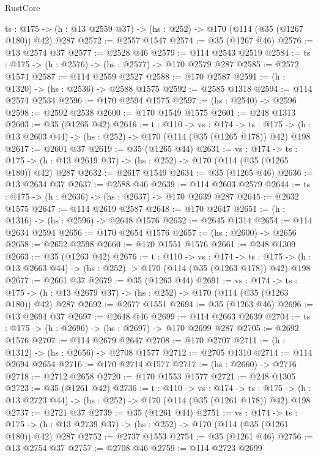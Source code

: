 \begin{lexlean}{RustCore}
\begin{coremodule}
  {ts : @175} -> (h : @13 @2559 @37) -> (hs : @252) -> @170 (@114 (@35 (@1267 @180)) @42) @287
@2572 := @2557 @1547
@2574 := @35 (@1267 @46)
@2576 := @13 @2574 @37
@2577 := @2528 @46
@2579 := @114 @2543 @2519
@2584 := {ts : @175} -> (h : @2576) -> (hs : @2577) -> @170 @2579 @287
@2585 := @2572 @1574
@2587 := @114 @2559 @2527
@2588 := @170 @2587
@2591 := (h : @1320) -> (hs : @2536) -> @2588 @1575
@2592 := @2585 @1318
@2594 := @114 @2574 @2534
@2596 := @170 @2594 @1575
@2597 := (hs : @2540) -> @2596
@2598 := @2592 @2538
@2600 := @170 @1549 @1575
@2601 := @248 @1313
@2603 := @35 (@1265 @42)
@2616 := {t : @110} ->
  {vs : @174} ->
  {ts : @175} -> (h : @13 @2603 @44) -> (hs : @252) -> @170 (@114 (@35 (@1265 @178)) @42) @198
@2617 := @2601 @37
@2619 := @35 (@1265 @44)
@2631 := {vs : @174} ->
  {ts : @175} -> (h : @13 @2619 @37) -> (hs : @252) -> @170 (@114 (@35 (@1265 @180)) @42) @287
@2632 := @2617 @1549
@2634 := @35 (@1265 @46)
@2636 := @13 @2634 @37
@2637 := @2588 @46
@2639 := @114 @2603 @2579
@2644 := {ts : @175} -> (h : @2636) -> (hs : @2637) -> @170 @2639 @287
@2645 := @2632 @1575
@2647 := @114 @2619 @2587
@2648 := @170 @2647
@2651 := (h : @1316) -> (hs : @2596) -> @2648 @1576
@2652 := @2645 @1314
@2654 := @114 @2634 @2594
@2656 := @170 @2654 @1576
@2657 := (hs : @2600) -> @2656
@2658 := @2652 @2598
@2660 := @170 @1551 @1576
@2661 := @248 @1309
@2663 := @35 (@1263 @42)
@2676 := {t : @110} ->
  {vs : @174} ->
  {ts : @175} -> (h : @13 @2663 @44) -> (hs : @252) -> @170 (@114 (@35 (@1263 @178)) @42) @198
@2677 := @2661 @37
@2679 := @35 (@1263 @44)
@2691 := {vs : @174} ->
  {ts : @175} -> (h : @13 @2679 @37) -> (hs : @252) -> @170 (@114 (@35 (@1263 @180)) @42) @287
@2692 := @2677 @1551
@2694 := @35 (@1263 @46)
@2696 := @13 @2694 @37
@2697 := @2648 @46
@2699 := @114 @2663 @2639
@2704 := {ts : @175} -> (h : @2696) -> (hs : @2697) -> @170 @2699 @287
@2705 := @2692 @1576
@2707 := @114 @2679 @2647
@2708 := @170 @2707
@2711 := (h : @1312) -> (hs : @2656) -> @2708 @1577
@2712 := @2705 @1310
@2714 := @114 @2694 @2654
@2716 := @170 @2714 @1577
@2717 := (hs : @2660) -> @2716
@2718 := @2712 @2658
@2720 := @170 @1553 @1577
@2721 := @248 @1305
@2723 := @35 (@1261 @42)
@2736 := {t : @110} ->
  {vs : @174} ->
  {ts : @175} -> (h : @13 @2723 @44) -> (hs : @252) -> @170 (@114 (@35 (@1261 @178)) @42) @198
@2737 := @2721 @37
@2739 := @35 (@1261 @44)
@2751 := {vs : @174} ->
  {ts : @175} -> (h : @13 @2739 @37) -> (hs : @252) -> @170 (@114 (@35 (@1261 @180)) @42) @287
@2752 := @2737 @1553
@2754 := @35 (@1261 @46)
@2756 := @13 @2754 @37
@2757 := @2708 @46
@2759 := @114 @2723 @2699

\end{coremodule}
\end{lexlean}
